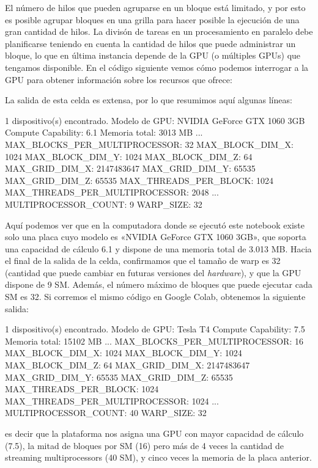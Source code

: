 El número de hilos que pueden agruparse en un bloque está limitado, y por esto es posible agrupar bloques en una grilla para hacer posible la ejecución de una gran cantidad de hilos. La divisón de tareas en un procesamiento en paralelo debe planificarse teniendo en cuenta la cantidad de hilos que puede administrar un bloque, lo que en última instancia depende de la GPU (o múltiples GPUs) que tengamos disponible. En el código siguiente vemos cómo podemos interrogar a la GPU para obtener información sobre los recursos que ofrece:


La salida de esta celda es extensa, por lo que resumimos aquí algunas líneas:
\begin{shell}
1 dispositivo(s) encontrado.
Modelo de GPU: NVIDIA GeForce GTX 1060 3GB
  Compute Capability: 6.1
  Memoria total: 3013 MB
  ...
 MAX_BLOCKS_PER_MULTIPROCESSOR: 32
 MAX_BLOCK_DIM_X: 1024
 MAX_BLOCK_DIM_Y: 1024
 MAX_BLOCK_DIM_Z: 64
 MAX_GRID_DIM_X: 2147483647
 MAX_GRID_DIM_Y: 65535
 MAX_GRID_DIM_Z: 65535
 MAX_THREADS_PER_BLOCK: 1024
 MAX_THREADS_PER_MULTIPROCESSOR: 2048
  ...
 MULTIPROCESSOR_COUNT: 9
 WARP_SIZE: 32
\end{shell}

Aquí podemos ver que en la computadora donde se ejecutó este notebook existe solo una placa cuyo modelo es «NVIDIA GeForce GTX 1060 3GB», que soporta una capacidad de cálculo 6.1 y dispone de una memoria total de 3.013 MB. Hacia el final de la salida de la celda, confirmamos que el tamaño de warp es 32 (cantidad que puede cambiar en futuras versiones del \textit{hardware}), y que la GPU dispone de 9 SM. Además, el número máximo de bloques que puede ejecutar cada SM es 32. Si corremos el mismo código en Google Colab, obtenemos la siguiente salida:
\begin{shell}
1 dispositivo(s) encontrado.
Modelo de GPU: Tesla T4
  Compute Capability: 7.5
  Memoria total: 15102 MB
  ...
 MAX_BLOCKS_PER_MULTIPROCESSOR: 16
 MAX_BLOCK_DIM_X: 1024
 MAX_BLOCK_DIM_Y: 1024
 MAX_BLOCK_DIM_Z: 64
 MAX_GRID_DIM_X: 2147483647
 MAX_GRID_DIM_Y: 65535
 MAX_GRID_DIM_Z: 65535
 MAX_THREADS_PER_BLOCK: 1024
 MAX_THREADS_PER_MULTIPROCESSOR: 1024
 ...
 MULTIPROCESSOR_COUNT: 40
 WARP_SIZE: 32
\end{shell}
es decir que la plataforma nos asigna una GPU con mayor capacidad de cálculo (7.5), la mitad de bloques por SM (16) pero más de 4 veces la cantidad de streaming multiprocessors (40 SM), y cinco veces la memoria de la placa anterior.

